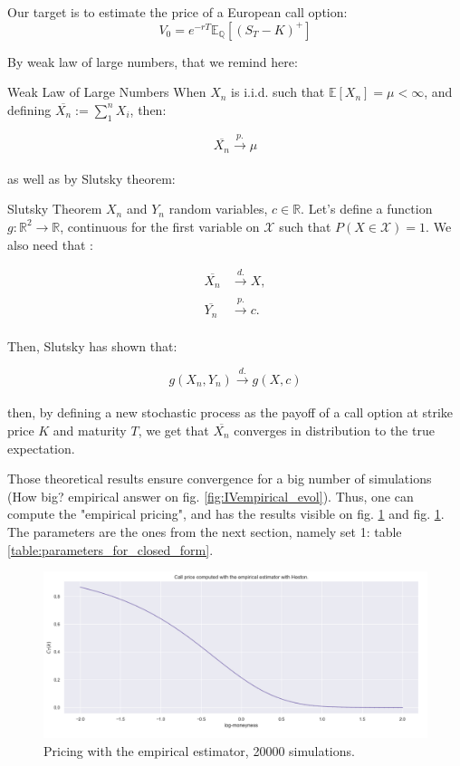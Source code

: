 Our target is to estimate the price of a European call option:
$$V_0 = e^{-r T}  \mathbb E_{\mathbb Q} [ (S_T - K)^+ ] $$

By weak law of large numbers, that we remind here:

\begin{theoreme}{Weak Law of Large Numbers \cite{panaretos}}
When $X_n$ is i.i.d. such that $\mathbb E [ X_n ] = \mu < \infty $, and defining  $ \overline{ X_n } := \sum^n_1 X_i $, then:

$$ \overline{X_n} \xrightarrow[]{p.} \mu $$ 
\end{theoreme}

as well as by Slutsky theorem:

\begin{theoreme}{Slutsky Theorem \cite{panaretos} }
$X_n$ and $Y_n$ random variables, $c \in \mathbb R$.
Let's define a function $g \colon \mathbb R^2 \to \mathbb R$, continuous for the first variable on $\mathcal X$ such that $P(X \in \mathcal X) = 1$. We also need that :

\begin{align*}
\overline{X_n} &\xrightarrow[]{d.} X,  \\
\overline{Y_n} &\xrightarrow[]{p.} c.
\end{align*}

Then, Slutsky has shown that: 

$$ g(X_n, Y_n)\xrightarrow[]{d.} g(X,c)$$

\end{theoreme}


then, by defining a new stochastic process as the payoff of a call option at strike price $K$ and maturity $T$, we get that $\overline{X_n}$ converges in distribution to the true expectation. 

Those theoretical results ensure convergence for a big number of simulations (How big? empirical answer on fig. \ref{fig:IVempirical_evol}). Thus, one can compute the "empirical pricing", and has the results visible on fig. \ref{fig:simulations_empirical_pricing} and fig. \ref{fig:simulations_empirical_pricing}. The parameters are the ones from the next section, namely set 1: table \ref{table:parameters_for_closed_form}. 

\begin{figure}
\centering
   \includegraphics[width = 0.8 \textwidth]{../addition_part/images/integration_fft/empirical_pricing_5000.png}
   \caption{Pricing with the empirical estimator, 20000 simulations.}
   \label{fig:simulations_empirical_pricing}
\end{figure}


